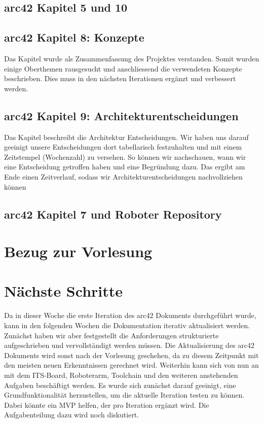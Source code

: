 \documentclass{article}
\begin{document}
\subsection{arc42 Kapitel 5 und 10}


\subsection{arc42 Kapitel 8: Konzepte}
Das Kapitel wurde als Zusammenfassung des Projektes verstanden. Somit wurden einige Oberthemen rausgesucht und anschliessend die verwendeten Konzepte beschrieben. Dies muss in den nächsten Iterationen ergänzt und verbessert werden.

\subsection{arc42 Kapitel 9: Architekturentscheidungen}
Das Kapitel  beschreibt die Architektur Entscheidungen. Wir haben uns darauf geeinigt unsere Entscheidungen dort tabellarisch festzuhalten und mit einem Zeitstempel (Wochenzahl) zu versehen. So können wir nachschauen, wann wir eine Entscheidung getroffen haben und eine Begründung dazu. Das ergibt am Ende einen Zeitverlauf, sodass wir Architekturentscheidungen nachvollziehen können


\subsection{arc42 Kapitel 7 und Roboter Repository}



\section{Bezug zur Vorlesung}

 

\section{Nächste Schritte}
Da in dieser Woche die erste Iteration des arc42 Dokuments durchgeführt wurde, kann in den folgenden Wochen die Dokumentation iterativ aktualisiert werden. Zunächst haben wir aber festgestellt die Anforderungen strukturierte aufgeschrieben und vervollständigt werden müssen. Die Aktualisierung des arc42 Dokuments wird sonst nach der Vorlesung geschehen, da zu diesem Zeitpunkt mit den meisten neuen Erkenntnissen gerechnet wird. Weiterhin kann sich von nun an mit dem ITS-Board, Roboterarm, Toolchain und den weiteren anstehenden Aufgaben beschäftigt werden. Es wurde sich zunächst darauf geeinigt, eine Grundfunktionalität herzustellen, um die aktuelle Iteration testen zu können. Dabei könnte ein MVP helfen, der pro Iteration ergänzt wird. Die Aufgabenteilung dazu wird noch diskutiert.
\end{document}
